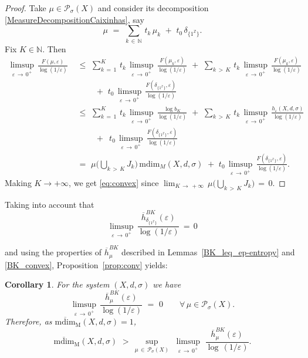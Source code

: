 \documentclass[11pt,a4paper,reqno]{amsart}
\theoremstyle{plain}
\newtheorem{corollary}[theorem]{Corollary}
\theoremstyle{definition}
\newcommand{\field}[1]{\mathbb{#1}}
\newcommand{\ZZ}{\field{Z}}
\newcommand{\NN}{\field{N}}
\newcommand{\ep} {\varepsilon}
\newcommand{\vep}{\varepsilon}
\newcommand{\si} {\sigma}       \newcommand{\Si}{\Sigma}
\newcommand{\cP}{{\mathcal P}}
\begin{document}
\begin{proof}
Take $\mu \in \cP_\sigma(X)$ and consider its decomposition  \eqref{MeasureDecompositionCaixinhas}, say
$$\mu\,\,=\,\,\sum_{k\,\in\,\NN}\, t_k\,\mu_k\,\,+\,\,t_0\,\delta_{\{1^\ZZ\}}.$$
Fix $K\in\NN$. Then
\begin{align*}
\limsup_{\ep\,\to\,0^+}\,\frac{F(\mu,\ep)}{\log(1/\ep)}\,\,&\leq\,\,\sum_{k\,=\,1}^K\, t_k\,\limsup_{\ep\,\to\,0^+}\,\frac{F(\mu_k,\ep)}{\log(1/\ep)}\,\,+\,\,\sum_{k\,>\,K}\, t_k\,\limsup_{\ep\,\to\,0^+}\,\frac{F(\mu_k,\ep)}{\log(1/\ep)} \\
&\qquad\,+\,\,t_0\,\limsup_{\ep\,\to\,0^+}\,\frac{F(\delta_{\{1^\ZZ\}},\ep)}{\log(1/\ep)}
\\&\leq\,\,\sum_{k\,=\,1}^K\, t_k\,\limsup_{\ep\,\to\,0^+}\,\frac{\log b_K}{\log(1/\ep)}\,\,+\,\,\sum_{k\,>\,K}\, t_k\,\limsup_{\ep\,\to\,0^+}\,\frac{h_\ep(X,d,\si)}{\log(1/\ep)} \\
&\qquad\,+\,\,\,t_0\,\limsup_{\ep\,\to\,0^+}\,\frac{F(\delta_{\{1^\ZZ\}},\ep)}{\log(1/\ep)}\\
&=\,\,\mu\big( \bigcup_ {k\,>\,K} J_k\big)\,\mathrm{mdim}_M(X,d,\si)\,\,+\,\,t_0\,\limsup_{\ep\,\to\,0^+}\,\frac{F(\delta_{\{1^\ZZ\}},\ep)}{\log(1/\ep)}.
\end{align*}
Making $K\to+\infty$, we get \eqref{eq:convex} since
$\lim_{K \, \to \, +\infty}\,\mu\big( \bigcup_ {k\,>\,K} J_k\big) \, = \, 0.$
\end{proof}


Taking into account that
$$\limsup_{\ep\,\to\,0^+}\,\frac{\overline{h}_{\delta_{\{1^\ZZ\}}}^{BK}(\ep)}{\log(1/\ep)} \, = \, 0$$
\smallskip

\noindent and using the properties of $\overline{h}_\mu^{BK}$ described in Lemmas~\ref{BK_leq_ep-entropy} and \ref{BK_convex}, Proposition~\ref{prop:conv} yields:

\begin{corollary}\label{cor:BK}
For the system $(X,d,\si)$ we have $$\limsup_{\ep\,\to\,0^+}\,\frac{\overline{h}_\mu^{BK}(\ep)}{\log(1/\ep)}\,\,=\,\,0\qquad \forall\, \mu\in\cP_\si(X).$$
Therefore, as $\mathrm{\overline{mdim}_M}(X,d,\sigma)=1$,
$$\mathrm{\overline{mdim}_M}(X,d,\sigma) \,\, >\, \sup_{\mu\,\in\,\cP_\sigma(X)}\,\,  \limsup_{\vep \, \to \, 0^+} \, \,\frac{\overline{h}_\mu^{BK}(\ep)}{\log \,(1/\vep)}.$$
\end{corollary}
\end{document}

